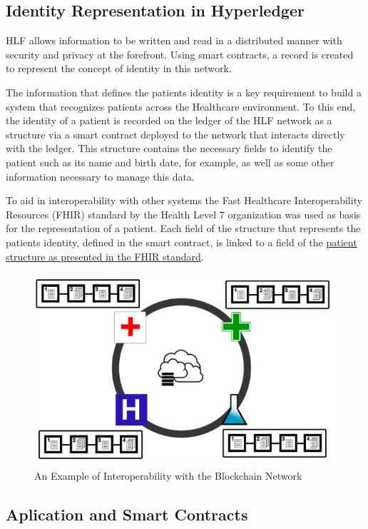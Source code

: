 \documentclass[]{llncs}
\begin{document}
\subsection{Identity Representation in Hyperledger}
 
HLF allows information to be written and read in a distributed manner with security and
privacy at the forefront. Using smart contracts, a record is created to represent the concept of 
identity in this network.

The information that defines the patients identity is a key requirement to build a
system that recognizes patients across the Healthcare environment. 
To this end, the identity of a patient is recorded on the ledger of the HLF network
as a structure via a smart contract deployed to the network that interacts directly with the ledger. 
This structure contains the necessary fields to identify the patient
such as its name and birth date, for example, as well as some other information
necessary to manage this data. 

To aid in interoperability with other systems the Fast Healthcare Interoperability Resources (FHIR) 
standard by the Health Level 7 organization was used as basis for the representation of a patient. 
Each field of the structure that represents the patients identity, defined in the smart contract, 
is linked to a field of the \href{http://www.hl7.org/fhir/patient.html}{patient structure as presented in the FHIR standard}.

\begin{figure}[ht]
\centering
\includegraphics[width=0.7\linewidth]{images/interoperability.png}
\caption{\label{fig:interoperability}An Example of Interoperability with the Blockchain Network}
\end{figure}

\subsection{Aplication and Smart Contracts}
\end{document}
